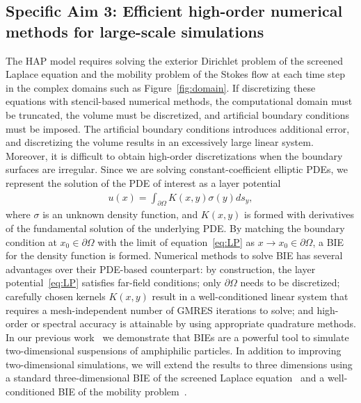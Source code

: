 \newpage

\subsection{Specific Aim 3: Efficient high-order numerical methods for
large-scale simulations}
\label{subsec:specific_aim_3}
The HAP model requires solving the exterior Dirichlet problem of the
screened Laplace equation and the mobility problem of the Stokes flow at
each time step in the complex domains such as Figure~\ref{fig:domain}.
If discretizing these equations with stencil-based numerical methods,
the computational domain must be truncated, the volume must be
discretized, and artificial boundary conditions must be imposed. The
artificial boundary conditions introduces additional error, and
discretizing the volume results in an excessively large linear system.
Moreover, it is difficult to obtain high-order discretizations when the
boundary surfaces are irregular. Since we are solving
constant-coefficient elliptic PDEs, we represent the solution of the PDE
of interest as a layer potential 
\begin{align}
  \label{eq:LP}
  u(x) = \int_{\partial\Omega} K(x,y) \sigma(y) ds_y,
\end{align}
where $\sigma$ is an unknown density function, and $K(x,y)$ is formed
with derivatives of the fundamental solution of the underlying PDE. By
matching the boundary condition at $x_0 \in \partial\Omega$ with the
limit of equation~\eqref{eq:LP} as $x\rightarrow x_0 \in
\partial\Omega$, a BIE for the density function is formed.
Numerical methods to solve BIE has several advantages over their
PDE-based counterpart: by construction, the layer
potential~\eqref{eq:LP} satisfies far-field conditions; only
$\partial\Omega$ needs to be discretized; carefully chosen kernels
$K(x,y)$ result in a well-conditioned linear system that requires a
mesh-independent number of GMRES iterations to solve; and high-order or
spectral accuracy is attainable by using appropriate quadrature methods.
In our previous work~\cite{Fu2018_SIAM} we demonstrate that BIEs are a
powerful tool to simulate two-dimensional suspensions of amphiphilic
particles. In addition to improving two-dimensional simulations, we will
extend the results to three dimensions using a standard
three-dimensional BIE of the screened Laplace equation~\cite{ying_2006}
and a well-conditioned BIE of the mobility problem~\cite{manasthesis}.

